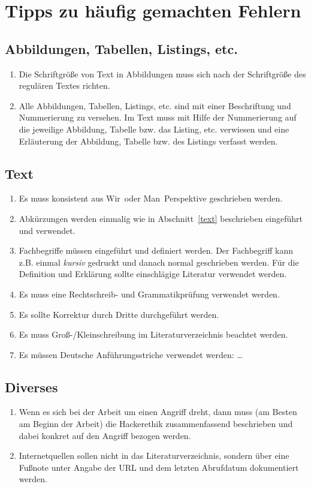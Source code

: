 \chapter{Tipps zu häufig gemachten Fehlern}

\section{Abbildungen, Tabellen, Listings, etc.}
\begin{enumerate}
 \item Die Schriftgröße von Text in Abbildungen muss sich nach der Schriftgröße
 des regulären Textes richten.
 \item Alle Abbildungen, Tabellen, Listings, etc. sind mit einer Beschriftung
 und Nummerierung zu versehen. Im Text muss mit Hilfe der Nummerierung auf
 die jeweilige Abbildung, Tabelle bzw. das Listing, etc. verwiesen und eine
 Erläuterung der Abbildung, Tabelle bzw. des Listings verfasst werden.
\end{enumerate}

\section{Text}
\begin{enumerate}
 \item Es muss konsistent aus \glqq Wir\grqq\ oder \glqq Man\grqq\ Perspektive geschrieben werden.
 \item Abkürzungen werden einmalig wie in Abschnitt~\ref{text} beschrieben eingeführt
 und verwendet.
 \item Fachbegriffe müssen eingeführt und definiert werden. Der Fachbegriff kann
 z.B. einmal \textit{kursiv} gedruckt und danach normal geschrieben werden. Für
 die Definition und Erklärung sollte einschlägige Literatur verwendet werden.
 \item Es muss eine Rechtschreib- und Grammatikprüfung verwendet werden.
 \item Es sollte Korrektur durch Dritte durchgeführt werden.
 \item Es muss Groß-/Kleinschreibung im Literaturverzeichnis beachtet werden.
 \item Es müssen Deutsche Anführungsstriche verwendet werden: \glqq \dots\grqq
\end{enumerate}

\section{Diverses}
\begin{enumerate}
 \item Wenn es sich bei der Arbeit um einen Angriff dreht, dann muss
 (am Besten am Beginn der Arbeit) die Hackerethik zusammenfassend beschrieben
 und dabei konkret auf den Angriff bezogen werden.
 \item Internetquellen sollen nicht in das Literaturverzeichnis, sondern über
 eine Fußnote unter Angabe der URL und dem letzten Abrufdatum dokumentiert
 werden.
\end{enumerate}